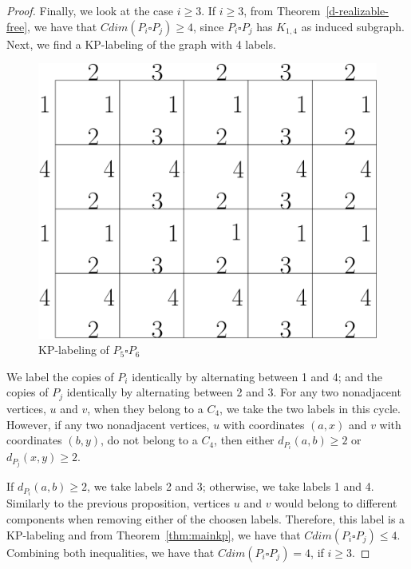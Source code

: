 \documentclass[12pt,a4paper,titlepage,openany]{report}
\begin{document}
\begin{proof}
Finally, we look at the case $i\geq 3$.
\newline
If $i\geq 3$, from Theorem~\ref{d-realizable-free}, we have that $Cdim(P_i\square P_j)\geq 4$, since $P_i \square P_j$ has $K_{1,4}$ as induced subgraph.\newline
Next, we find a KP-labeling of the graph with 4 labels.
\begin{figure}[h]
\begin{center}
\includegraphics[width=1\linewidth]{figures/p_isqp_j.png}
\end{center}
\caption{KP-labeling of $P_5\square P_6$}
\end{figure}\newline
We label the copies of $P_i$ identically by alternating between 1 and 4; and the copies of $P_j$ identically by alternating between 2 and 3.\newline
For any two nonadjacent vertices, $u$ and $v$, when they belong to a $C_4$, we take the two labels in this cycle. However, if any two nonadjacent vertices, $u$ with coordinates $(a,x)$ and $v$ with coordinates $(b,y)$, do not belong to a $C_4$, then either $d_{P_i}(a,b) \geq 2$ or $d_{P_j}(x,y) \ge 2$. 

If $d_{P_i}(a,b) \geq 2$, we take labels 2 and 3; otherwise, we take labels 1 and 4. Similarly to the previous proposition, vertices $u$ and $v$ would belong to different components when removing either of the choosen labels. 
 \newline
Therefore, this label is a KP-labeling and from Theorem~\ref{thm:mainkp}, we have that $Cdim(P_i\square P_j)\leq 4$.\newline
Combining both inequalities, we have that $Cdim(P_i\square P_j)=4$, if $i\geq 3$.
\end{proof}
\end{document}
